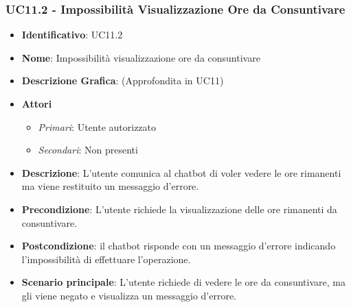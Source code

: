 \subsubsection{UC11.2 - Impossibilità Visualizzazione Ore da Consuntivare}
\begin{itemize}
	\item \textbf{Identificativo}: UC11.2
	\item \textbf{Nome}: Impossibilità visualizzazione ore da consuntivare
	\item \textbf{Descrizione Grafica}: (Approfondita in UC11)
	\item \textbf{Attori}
	\begin{itemize} 
		\item \textit{Primari}: Utente autorizzato
		\item \textit{Secondari}: Non presenti
	\end{itemize}
	\item \textbf{Descrizione}: L'utente comunica al chatbot di voler vedere le ore rimanenti ma viene restituito un messaggio d'errore.
	\item \textbf{Precondizione}: L'utente richiede la visualizzazione delle ore rimanenti da consuntivare.
	\item \textbf{Postcondizione}: il chatbot risponde con un messaggio d'errore indicando l'impossibilità di effettuare l'operazione.
	\item \textbf{Scenario principale}: L'utente richiede di vedere le ore da consuntivare, ma gli viene negato e visualizza un messaggio d'errore.
\end{itemize}
\newpage